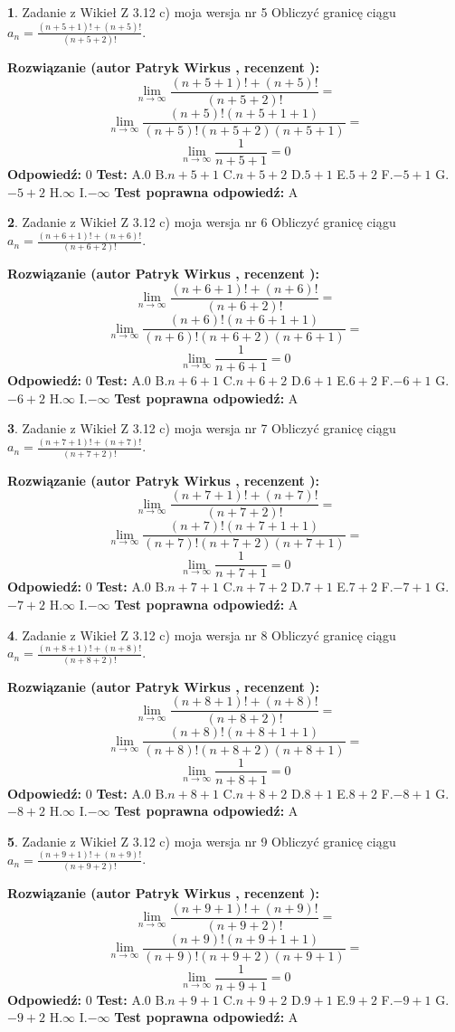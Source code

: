 \documentclass[12pt, a4paper]{article}
\theoremstyle{definition} %
\newtheorem{zad}{}
\newcommand{\zadStart}[1]{\begin{zad}#1\newline}
\newcommand{\zadStop}{\end{zad}}
\newcommand{\rozwStart}[2]{\noindent \textbf{Rozwiązanie (autor #1 , recenzent #2): }\newline}
\newcommand{\rozwStop}{\newline}
\newcommand{\odpStart}{\noindent \textbf{Odpowiedź:}\newline}
\newcommand{\odpStop}{\newline}
\newcommand{\testStart}{\noindent \textbf{Test:}\newline}
\newcommand{\testStop}{\newline}
\newcommand{\kluczStart}{\noindent \textbf{Test poprawna odpowiedź:}\newline}
\newcommand{\kluczStop}{\newline}
\begin{document}
\zadStart{Zadanie z Wikieł Z 3.12 c) moja wersja nr 5}
Obliczyć granicę ciągu $a_{n}=\frac{(n+5+1)!+(n+5)!}{(n+5+2)!}$.
\zadStop
\rozwStart{Patryk Wirkus}{}
$$\lim\limits_{n\to\infty}\frac{(n+5+1)!+(n+5)!}{(n+5+2)!}=$$
$$\lim\limits_{n\to\infty}\frac{(n+5)!(n+5+1+1)}{(n+5)!(n+5+2)(n+5+1)}=$$
$$\lim\limits_{n\to\infty}\frac{1}{n+5+1}= 0$$
\rozwStop
\odpStart
$0$
\odpStop
\testStart
A.$0$
B.$n+5+1$
C.$n+5+2$
D.$5+1$
E.$5+2$
F.$-5+1$
G.$-5+2$
H.$\infty$
I.$-\infty$
\testStop
\kluczStart
A
\kluczStop



\zadStart{Zadanie z Wikieł Z 3.12 c) moja wersja nr 6}
Obliczyć granicę ciągu $a_{n}=\frac{(n+6+1)!+(n+6)!}{(n+6+2)!}$.
\zadStop
\rozwStart{Patryk Wirkus}{}
$$\lim\limits_{n\to\infty}\frac{(n+6+1)!+(n+6)!}{(n+6+2)!}=$$
$$\lim\limits_{n\to\infty}\frac{(n+6)!(n+6+1+1)}{(n+6)!(n+6+2)(n+6+1)}=$$
$$\lim\limits_{n\to\infty}\frac{1}{n+6+1}= 0$$
\rozwStop
\odpStart
$0$
\odpStop
\testStart
A.$0$
B.$n+6+1$
C.$n+6+2$
D.$6+1$
E.$6+2$
F.$-6+1$
G.$-6+2$
H.$\infty$
I.$-\infty$
\testStop
\kluczStart
A
\kluczStop



\zadStart{Zadanie z Wikieł Z 3.12 c) moja wersja nr 7}
Obliczyć granicę ciągu $a_{n}=\frac{(n+7+1)!+(n+7)!}{(n+7+2)!}$.
\zadStop
\rozwStart{Patryk Wirkus}{}
$$\lim\limits_{n\to\infty}\frac{(n+7+1)!+(n+7)!}{(n+7+2)!}=$$
$$\lim\limits_{n\to\infty}\frac{(n+7)!(n+7+1+1)}{(n+7)!(n+7+2)(n+7+1)}=$$
$$\lim\limits_{n\to\infty}\frac{1}{n+7+1}= 0$$
\rozwStop
\odpStart
$0$
\odpStop
\testStart
A.$0$
B.$n+7+1$
C.$n+7+2$
D.$7+1$
E.$7+2$
F.$-7+1$
G.$-7+2$
H.$\infty$
I.$-\infty$
\testStop
\kluczStart
A
\kluczStop



\zadStart{Zadanie z Wikieł Z 3.12 c) moja wersja nr 8}
Obliczyć granicę ciągu $a_{n}=\frac{(n+8+1)!+(n+8)!}{(n+8+2)!}$.
\zadStop
\rozwStart{Patryk Wirkus}{}
$$\lim\limits_{n\to\infty}\frac{(n+8+1)!+(n+8)!}{(n+8+2)!}=$$
$$\lim\limits_{n\to\infty}\frac{(n+8)!(n+8+1+1)}{(n+8)!(n+8+2)(n+8+1)}=$$
$$\lim\limits_{n\to\infty}\frac{1}{n+8+1}= 0$$
\rozwStop
\odpStart
$0$
\odpStop
\testStart
A.$0$
B.$n+8+1$
C.$n+8+2$
D.$8+1$
E.$8+2$
F.$-8+1$
G.$-8+2$
H.$\infty$
I.$-\infty$
\testStop
\kluczStart
A
\kluczStop



\zadStart{Zadanie z Wikieł Z 3.12 c) moja wersja nr 9}
Obliczyć granicę ciągu $a_{n}=\frac{(n+9+1)!+(n+9)!}{(n+9+2)!}$.
\zadStop
\rozwStart{Patryk Wirkus}{}
$$\lim\limits_{n\to\infty}\frac{(n+9+1)!+(n+9)!}{(n+9+2)!}=$$
$$\lim\limits_{n\to\infty}\frac{(n+9)!(n+9+1+1)}{(n+9)!(n+9+2)(n+9+1)}=$$
$$\lim\limits_{n\to\infty}\frac{1}{n+9+1}= 0$$
\rozwStop
\odpStart
$0$
\odpStop
\testStart
A.$0$
B.$n+9+1$
C.$n+9+2$
D.$9+1$
E.$9+2$
F.$-9+1$
G.$-9+2$
H.$\infty$
I.$-\infty$
\testStop
\kluczStart
A
\kluczStop
\end{document}
